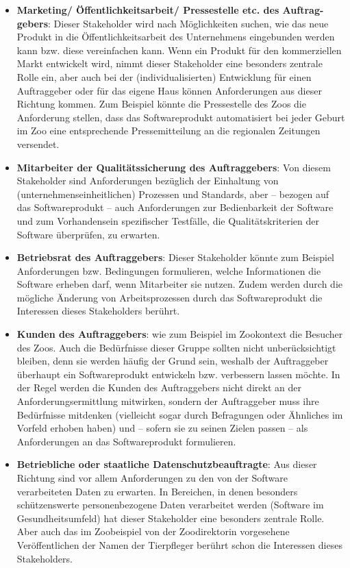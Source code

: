 \begin{itemize}
	\item \textbf{Marketing/ Öffentlichkeitsarbeit/ Pressestelle etc. des 
	Auftrag- \linebreak
	gebers}: Dieser Stakeholder wird nach Möglichkeiten suchen, wie das neue Produkt in die Öffentlichkeitsarbeit des Unternehmens eingebunden werden kann bzw. diese vereinfachen kann. Wenn ein Produkt für den kommerziellen Markt entwickelt wird, nimmt dieser Stakeholder eine besonders zentrale Rolle ein, aber auch bei der (individualisierten) Entwicklung für einen Auftraggeber oder für das eigene Haus können Anforderungen aus dieser Richtung kommen. Zum Beispiel könnte die Pressestelle des Zoos die Anforderung stellen, dass das Softwareprodukt automatisiert bei jeder Geburt im Zoo eine entsprechende Pressemitteilung an die regionalen Zeitungen versendet.
	\item \textbf{Mitarbeiter der Qualitätssicherung des Auftraggebers}: Von diesem Stakeholder sind Anforderungen bezüglich der Einhaltung von (unternehmenseinheitlichen) Prozessen und Standards, aber -- bezogen auf das Software\-produkt -- auch Anforderungen zur Bedienbarkeit der Software und zum Vorhandensein spezifischer Testfälle, die Qualitätskriterien der Software über\-prüfen, zu erwarten.
	\item \textbf{Betriebsrat des Auftraggebers}: Dieser Stakeholder könnte zum Beispiel Anforderungen bzw. Bedingungen formulieren, welche Informationen die Software erheben darf, wenn Mitarbeiter sie nutzen. Zudem werden durch die mögliche Änderung von Arbeitsprozessen durch das Softwareprodukt die \mbox{Interessen} dieses Stakeholders berührt.
	\item \textbf{Kunden des Auftraggebers}: wie zum Beispiel im Zookontext die Besucher des Zoos. Auch die Bedürfnisse dieser Gruppe sollten nicht unberücksichtigt bleiben, denn sie werden häufig der Grund sein, weshalb der Auftraggeber überhaupt ein Softwareprodukt entwickeln bzw. verbessern lassen möchte. In der Regel werden die Kunden des Auftraggebers nicht direkt an der Anforderungsermittlung mitwirken, sondern der Auftraggeber muss ihre Bedürfnisse mitdenken (vielleicht sogar durch Befragungen oder Ähnliches im Vorfeld erhoben haben) und -- sofern sie zu seinen Zielen passen -- als Anforderungen an das Softwareprodukt formulieren.
	\item \textbf{Betriebliche oder staatliche Datenschutzbeauftragte}: Aus dieser Richtung sind vor allem Anforderungen zu den von der Software verarbeiteten Daten zu erwarten. In Bereichen, in denen besonders schützenswerte personenbezogene Daten verarbeitet werden (\zb Software im Gesundheitsumfeld) hat dieser Stakeholder eine besonders zentrale Rolle. Aber auch das im Zoobeispiel von der Zoodirektorin vorgesehene Veröffentlichen der Namen der Tierpfleger berührt schon die Interessen dieses Stakeholders.

\end{itemize}
